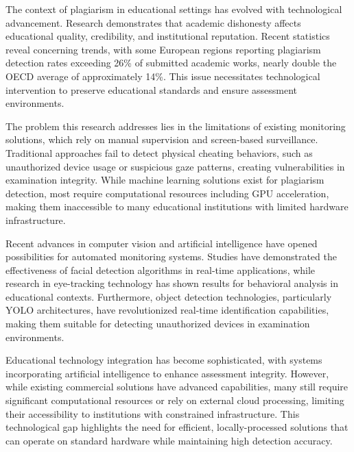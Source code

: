 \documentclass[conference]{IEEEtran}
\begin{document}
The context of plagiarism in educational settings has evolved with 
technological advancement. Research demonstrates that academic dishonesty affects 
educational quality, credibility, and institutional reputation\cite{pelican2021plagiat}. 
Recent statistics reveal concerning trends, with some European regions reporting plagiarism 
detection rates exceeding 26\% of submitted academic works, nearly double the 
OECD average of approximately 14\%\cite{updated_regional_statistics}. This issue necessitates 
technological intervention to preserve educational standards and ensure 
assessment environments.

The problem this research addresses lies in the limitations of existing monitoring 
solutions, which rely on manual supervision and screen-based surveillance. 
Traditional approaches fail to detect physical cheating behaviors, such as unauthorized 
device usage or suspicious gaze patterns, creating vulnerabilities in examination 
integrity\cite{dilini2021cheating}. While machine learning solutions exist for plagiarism 
detection\cite{russell2020artificial}, most require computational resources 
including GPU acceleration, making them inaccessible to many educational institutions 
with limited hardware infrastructure.

Recent advances in computer vision and artificial intelligence have opened 
possibilities for automated monitoring systems. Studies have demonstrated the effectiveness 
of facial detection algorithms in real-time applications\cite{hasan2021face}, while 
research in eye-tracking technology has shown results for behavioral analysis 
in educational contexts\cite{el2023drowsiness}. Furthermore, object detection technologies, 
particularly YOLO architectures, have revolutionized real-time identification 
capabilities\cite{wang2022object}, making them suitable for detecting unauthorized 
devices in examination environments.

Educational technology integration has become sophisticated, with 
systems incorporating artificial intelligence to enhance assessment integrity\cite{honorlock2023detecting}. 
However, while existing commercial solutions have advanced capabilities, many still require significant computational resources 
or rely on external cloud processing, limiting their accessibility to institutions 
with constrained infrastructure\cite{proctoru}. This technological gap highlights 
the need for efficient, locally-processed solutions that can operate on standard 
hardware while maintaining high detection accuracy.
\end{document}

